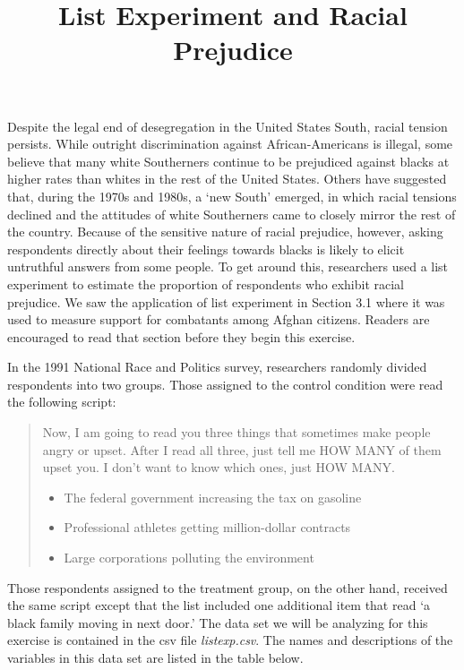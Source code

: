 \documentclass[]{article}
\title{List Experiment and Racial Prejudice}
\author{}
\date{}
\begin{document}
\maketitle


Despite the legal end of desegregation in the United States South,
racial tension persists. While outright discrimination against
African-Americans is illegal, some believe that many white Southerners
continue to be prejudiced against blacks at higher rates than whites in
the rest of the United States. Others have suggested that, during the
1970s and 1980s, a `new South' emerged, in which racial tensions
declined and the attitudes of white Southerners came to closely mirror
the rest of the country. Because of the sensitive nature of racial
prejudice, however, asking respondents directly about their feelings
towards blacks is likely to elicit untruthful answers from some people.
To get around this, researchers used a list experiment to estimate the
proportion of respondents who exhibit racial prejudice. We saw the
application of list experiment in Section 3.1 where it was used to
measure support for combatants among Afghan citizens. Readers are
encouraged to read that section before they begin this exercise.

In the 1991 National Race and Politics survey, researchers randomly
divided respondents into two groups. Those assigned to the control
condition were read the following script:

\begin{quote}
Now, I am going to read you three things that sometimes make people
angry or upset. After I read all three, just tell me HOW MANY of them
upset you. I don't want to know which ones, just HOW MANY.

\begin{itemize}
\itemsep1pt\parskip0pt
\item
  The federal government increasing the tax on gasoline
\item
  Professional athletes getting million-dollar contracts
\item
  Large corporations polluting the environment
\end{itemize}
\end{quote}

Those respondents assigned to the treatment group, on the other hand,
received the same script except that the list included one additional
item that read `a black family moving in next door.' The data set we
will be analyzing for this exercise is contained in the csv file
\emph{listexp.csv}. The names and descriptions of the variables in this
data set are listed in the table below.
\end{document}

